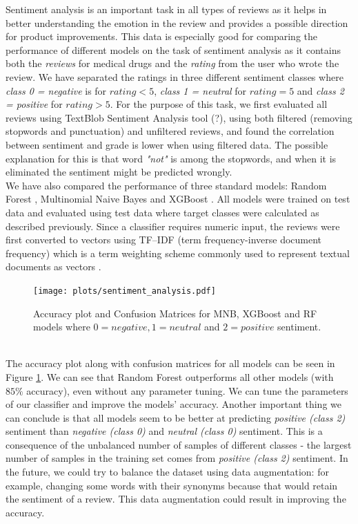 \documentclass{article}
\begin{document}
Sentiment analysis is an important task in all types of reviews as it helps in better understanding the emotion in the review and provides a possible direction for product improvements. This data is especially good for comparing the performance of different models on the task of sentiment analysis as it contains both the \emph{reviews} for medical drugs and the \emph{rating} from the user who wrote the review. We have separated the ratings in three different sentiment classes where \textit{class 0 = negative} is for $rating<5$, \textit{class 1 = neutral} for $rating=5$ and \textit{class 2 = positive} for $rating>5$. For the purpose of this task, we first evaluated all reviews using TextBlob Sentiment Analysis tool (?), using both filtered (removing stopwords and punctuation) and unfiltered reviews, and found the correlation between sentiment and grade is lower when using filtered data. The possible explanation for this is that word \textit{"not"} is among the stopwords, and when it is eliminated the sentiment might be predicted wrongly.\\
We have also compared the performance of three standard models: Random Forest \citep{randomForest}, Multinomial Naive Bayes \citep{mnb} and XGBoost \citep{xgboost}. All models were trained on test data and evaluated using test data where target classes were calculated as described previously. Since a classifier requires numeric input, the reviews were first converted to vectors using TF–IDF (term frequency-inverse document frequency) which is a term weighting scheme commonly used to represent textual documents as vectors \citep{tfidf}.\\
\begin{figure}[h!]
\texttt{[image: plots/sentiment\_analysis.pdf]}
\caption{Accuracy plot and Confusion Matrices for MNB, XGBoost and RF models where $0=negative, 1=neutral$ and $2=positive$ sentiment.} 
\label{fig:acc}
\centering
\end{figure}\\
The accuracy plot along with confusion matrices for all models can be seen in Figure \ref{fig:acc}. We can see that Random Forest outperforms all other models (with $85\%$ accuracy), even without any parameter tuning. We can tune the parameters of our classifier and improve the models' accuracy. Another important thing we can conclude is that all models seem to be better at predicting \textit{positive (class 2)} sentiment than \textit{negative (class 0)} and \textit{neutral (class 0)} sentiment. This is a consequence of the unbalanced number of samples of different classes - the largest number of samples in the training set comes from \textit{positive (class 2)} sentiment. In the future, we could try to balance the dataset using data augmentation: for example, changing some words with their synonyms because that would retain the sentiment of a review. This data augmentation could result in improving the accuracy.
\end{document}
